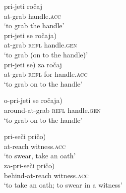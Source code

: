 \documentclass[output=paper,colorlinks,citecolor=brown]{langscibook}
\begin{document}
  \begin{comment}
     \ea \ea \gll pri-jeti \minsp{\{} ročaj / se \minsp{(} ročaja) / \minsp{(} se) za ročaj\} \\
   {at}-grab {} handle.\textsc{acc} { } \textsc{refl} {} handle.\textsc{gen} { }   {}  \textsc{refl} for handle.\textsc{acc} \\
  \glt `to grab the handle/ to grab on (to the handle)'%
  \ex   \gll o-pri-jeti \minsp{\{*} ročaj / se \minsp{*(} ročaja) / \minsp{*(} \minsp{*} se) za ročaj\} \\ 
     {around}-{at}-grab {} handle.\textsc{acc} { } \textsc{refl} {} handle.\textsc{gen} { }    {} {}  \textsc{refl}  for handle.\textsc{acc} {} \\
 \glt  `to grab on (to the handle)' %
\z \z
\end{comment}
\ea \label{ex:prijetiacc}  \ea  \gll pri-jeti  ročaj  \\
   {at}-grab  handle.\textsc{acc}\\
  \glt `to grab the handle'\\
  \ex   \gll pri-jeti  se \minsp{(} ročaja)  \\ 
     {at}-grab   \textsc{refl} {} handle.\textsc{gen} { }  \\
 \glt  `to grab (on to the handle)' \\
\ex   \gll pri-jeti \minsp{(} se) za ročaj \\ 
     {at}-grab {}  \textsc{refl}  for handle.\textsc{acc} {} \\
 \glt  `to grab on to the handle' 
\z \z


\ea \label{ex:oprijetiacc} 
  \ex   \gll o-pri-jeti   se \minsp{*(} ročaja)  \\ 
     {around}-{at}-grab   \textsc{refl} {} handle.\textsc{gen} \\
 \glt  `to grab on to the handle' 
\z \z 

   \ea \label{ex:priseci} \ea \gll pri-seči \minsp{(*} pričo)  \\
   {at}-reach {}  witness.\textsc{acc} \\
 \glt  `to swear, take an oath'\\
\ex \gll za-pri-seči \minsp{(} pričo) \\
   {behind}-{at}-reach {} witness.\textsc{acc}  \\
  \glt `to take an oath; to swear in a witness'\\
\z \z
\end{document}
